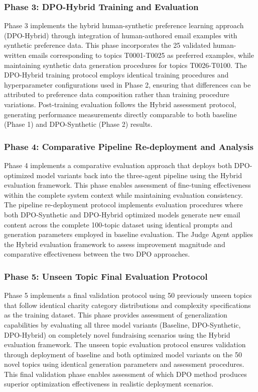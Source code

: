 \subsubsection{Phase 3: DPO-Hybrid Training and Evaluation}

Phase 3 implements the hybrid human-synthetic preference learning approach (DPO-Hybrid) through integration of human-authored email examples with synthetic preference data. This phase incorporates the 25 validated human-written emails corresponding to topics T0001-T0025 as preferred examples, while maintaining synthetic data generation procedures for topics T0026-T0100. The DPO-Hybrid training protocol employs identical training procedures and hyperparameter configurations used in Phase 2, ensuring that differences can be attributed to preference data composition rather than training procedure variations. Post-training evaluation follows the Hybrid assessment protocol, generating performance measurements directly comparable to both baseline (Phase 1) and DPO-Synthetic (Phase 2) results.

\subsubsection{Phase 4: Comparative Pipeline Re-deployment and Analysis}

Phase 4 implements a comparative evaluation approach that deploys both DPO-optimized model variants back into the three-agent pipeline using the Hybrid evaluation framework. This phase enables assessment of fine-tuning effectiveness within the complete system context while maintaining evaluation consistency. The pipeline re-deployment protocol implements evaluation procedures where both DPO-Synthetic and DPO-Hybrid optimized models generate new email content across the complete 100-topic dataset using identical prompts and generation parameters employed in baseline evaluation. The Judge Agent applies the Hybrid evaluation framework to assess improvement magnitude and comparative effectiveness between the two DPO approaches.

\subsubsection{Phase 5: Unseen Topic Final Evaluation Protocol}

Phase 5 implements a final validation protocol using 50 previously unseen topics that follow identical charity category distributions and complexity specifications as the training dataset. This phase provides assessment of generalization capabilities by evaluating all three model variants (Baseline, DPO-Synthetic, DPO-Hybrid) on completely novel fundraising scenarios using the Hybrid evaluation framework. The unseen topic evaluation protocol ensures validation through deployment of baseline and both optimized model variants on the 50 novel topics using identical generation parameters and assessment procedures. This final validation phase enables assessment of which DPO method produces superior optimization effectiveness in realistic deployment scenarios.


